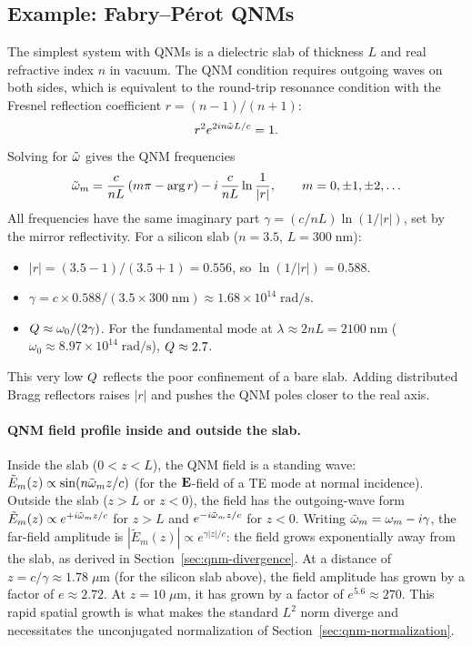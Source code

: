 \subsection{Example: Fabry--P\'erot QNMs}
\label{ssec:qnm-fabry-perot}

The simplest system with QNMs is a dielectric slab of thickness $L$ and
real refractive index $n$ in vacuum. The QNM condition requires outgoing
waves on both sides, which is equivalent to the round-trip resonance
condition with the Fresnel reflection coefficient
$r = (n-1)/(n+1)$:
\begin{equation}
 r^2 e^{2in\tilde{\omega} L/c} = 1.
 \label{eq:fp-qnm-condition}
\end{equation}
Solving for $\tilde{\omega}$ gives the QNM frequencies
\begin{equation}
 \tilde{\omega}_m = \frac{c}{nL}\left(m\pi - \arg r\right)
 - i\,\frac{c}{nL}\ln\frac{1}{|r|},
 \qquad m = 0, \pm 1, \pm 2, \ldots
 \label{eq:fp-qnm-freqs}
\end{equation}
All frequencies have the same imaginary part
$\gamma = (c/nL)\ln(1/|r|)$, set by the mirror reflectivity. For a
silicon slab ($n = 3.5$, $L = 300\;\mathrm{nm}$):
\begin{itemize}
 \item $|r| = (3.5-1)/(3.5+1) = 0.556$, so $\ln(1/|r|) = 0.588$.
 \item $\gamma = c \times 0.588 / (3.5 \times 300\;\mathrm{nm})
 \approx 1.68 \times 10^{14}\;\mathrm{rad/s}$.
 \item $Q \approx \omega_0/(2\gamma)$. For the fundamental mode
 at $\lambda \approx 2nL = 2100\;\mathrm{nm}$
 ($\omega_0 \approx 8.97 \times 10^{14}\;\mathrm{rad/s}$),
 $Q \approx 2.7$.
\end{itemize}
This very low $Q$ reflects the poor confinement of a bare slab.
Adding distributed Bragg reflectors raises $|r|$ and pushes the QNM
poles closer to the real axis.

\paragraph{QNM field profile inside and outside the slab.}
Inside the slab ($0 < z < L$), the QNM field is a standing wave:
$\tilde{E}_m(z) \propto \sin(n\tilde{\omega}_m z/c)$ (for the $\mathbf{E}$-field of a
TE mode at normal incidence). Outside the slab ($z > L$ or $z < 0$),
the field has the outgoing-wave form
$\tilde{E}_m(z) \propto e^{+i\tilde{\omega}_m z/c}$ for $z > L$ and
$e^{-i\tilde{\omega}_m z/c}$ for $z < 0$. Writing
$\tilde{\omega}_m = \omega_m - i\gamma$, the far-field amplitude is
$|\tilde{E}_m(z)| \propto e^{\gamma|z|/c}$: the field grows
exponentially away from the slab, as derived in
Section~\ref{sec:qnm-divergence}. At a distance of
$z = c/\gamma \approx 1.78\;\mu$m (for the silicon slab above), the
field amplitude has grown by a factor of $e \approx 2.72$.
At $z = 10\;\mu$m, it has grown by a factor of $e^{5.6} \approx 270$.
This rapid spatial growth is what makes the standard $L^2$ norm diverge
and necessitates the unconjugated normalization of
Section~\ref{sec:qnm-normalization}.

